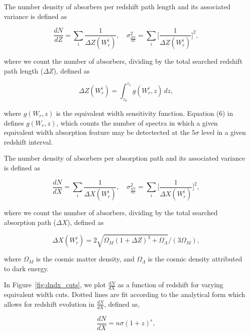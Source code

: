 \documentclass[iop,apj,numberedappendix,appendixfloats,twocolappendix]{emulateapj}
\begin{document}
The number density of {\MgII} absorbers per redshift path length and its associated variance is defined as

\begin{equation}
\frac{d N}{d Z} = \sum_{i}\frac{1}{\Delta Z(W_r^i)},\quad \sigma^2_{\frac{d N}{d Z}} = \sum_{i} \Big[\frac{1}{\Delta Z(W_r^i)}\Big]^2,
\label{eqn:dndz}
\end{equation}

where we count the number of {\MgII} absorbers, dividing by the total searched redshift path length ($\Delta Z$), defined as

\begin{equation}
\Delta Z(W_r^i) = \int_{z_0}^{z_1} g(W_r^i, z)\,dz,
\label{eqn:deltaz}
\end{equation}

where $g(W_r, z)$ is the equivalent width sensitivity function. Equation (6) in \cite{Lanzetta1987} defines $g(W_r, z)$, which counts the number of spectra in which a given equivalent width absorption feature may be detectected at the $5\sigma$ level in a given redshift interval. 

The number density of {\MgII} absorbers per absorption path and its associated variance is defined as

\begin{equation}
\frac{d N}{d X} = \sum_{i}\frac{1}{\Delta X(W_r^i)},\quad \sigma^2_{\frac{d N}{d Z}} = \sum_{i} \Big[\frac{1}{\Delta X(W_r^i)}\Big]^2,
\label{eqn:dndx}
\end{equation}

where we count the number of {\MgII} absorbers, dividing by the total searched absorption path ($\Delta X$), defined as

\begin{equation}
\Delta X(W_r^i) = 2 \sqrt{\Omega_M (1 + \Delta Z)^3 + \Omega_{\Lambda}} / (3 \Omega_M),
\label{eqn:deltax}
\end{equation}

where $\Omega_M$ is the cosmic matter density, and $\Omega_{\Lambda}$ is the cosmic density attributed to dark energy.

In Figure~\ref{fig:dndx_cuts}, we plot $\frac{dN}{dX}$ as a function of redshift for varying equivalent width cuts. Dotted lines are fit according to the analytical form which allows for redshift evolution in $\frac{dN}{dX}$, defined as,

\begin{equation}
\frac{dN}{dX} = n\sigma (1 + z)^{\epsilon},
\label{eqn:dndxfit}
\end{equation}
\end{document}
